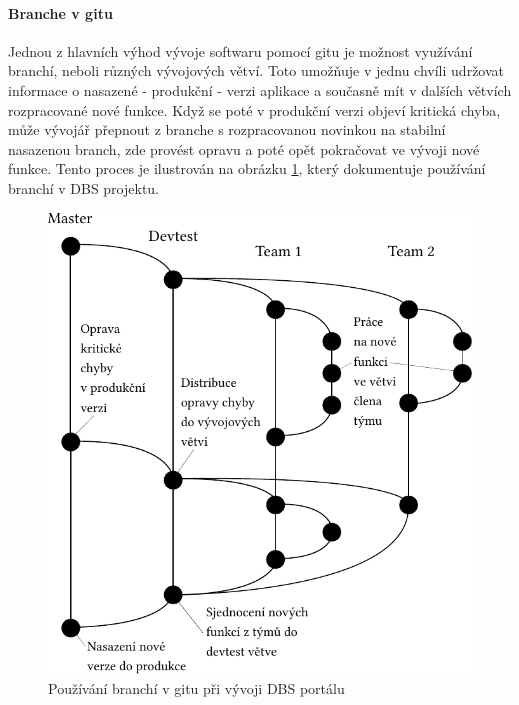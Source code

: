 \paragraph{Branche v gitu} \label{version:git:branching}
Jednou z hlavních výhod vývoje softwaru pomocí gitu je možnost využívání branchí, neboli různých vývojových větví. Toto umožňuje v jednu chvíli udržovat informace o nasazené - produkční - verzi aplikace a současně mít v dalších větvích rozpracované nové funkce. Když se poté v produkční verzi objeví kritická chyba, může vývojář přepnout z branche s rozpracovanou novinkou na stabilní nasazenou branch, zde provést opravu a poté opět pokračovat ve vývoji nové funkce. Tento proces je ilustrován na obrázku \ref{picture:git_branching}, který dokumentuje používání branchí v DBS projektu.\\
\begin{figure}[]
\includegraphics[width=\textwidth]{../pdf/git_branching.pdf}
\caption{Používání branchí v gitu při vývoji DBS portálu} \label{picture:git_branching}
\end{figure}
